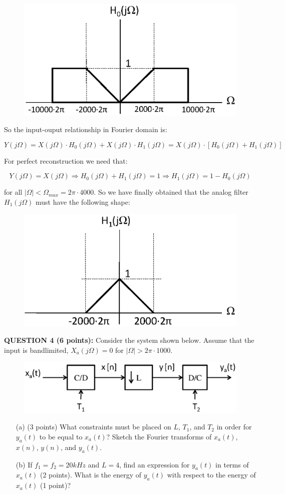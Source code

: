 \documentclass[a4paper,11pt,oneside]{article}
\begin{document}
\begin{figure}[h!]
\centering
\includegraphics[width=.5\textwidth]{fig3b.eps}
\label{fig3b}
\end{figure} 

So the input-ouput relationship in Fourier domain is: 

\[
Y(j\Omega)=X(j\Omega)\cdot H_{0}(j\Omega)+X(j\Omega)\cdot H_1(j\Omega)=X(j\Omega)\cdot\left[H_{0}(j\Omega)+H_{1}(j\Omega)\right]
\]

For perfect reconstruction we need that:

\[
Y(j\Omega)=X(j\Omega)\Rightarrow H_{0}(j\Omega)+H_{1}(j\Omega)=1 \Rightarrow H_1(j\Omega)=1-H_0(j\Omega)
\]

for all $|\Omega|<\Omega_{max}=2\pi\cdot 4000$. So we have finally obtained that the analog filter $H_{1}(j\Omega)$ must have the following shape:


\begin{figure}[h!]
\centering
\includegraphics[width=.5\textwidth]{fig3c.eps}
\label{fig3b}
\end{figure} 

\vspace{3cm}

\textbf{QUESTION 4 (6 points):} Consider the system shown below. Assume that the input is bandlimited, $X_a(j\Omega)=0$ for $|\Omega|>2\pi\cdot 1000$.

\begin{figure}[h!]
\centering
\includegraphics[width=.8\textwidth]{fig3.eps}
\label{fig3}
\end{figure} 
\begin{itemize}
\item[(a)] (3 points) What constraints must be placed on $L$, $T_1$, and $T_{2}$ in order for $y_a(t)$ to be equal to $x_a(t)$? Sketch the Fourier transforms of $x_a(t)$, $x(n)$, $y(n)$, and $y_a(t)$.
\item[(b)] If $f_1=f_2=20kHz$ and $L=4$, find an expression for $y_a(t)$ in terms of $x_a(t)$ (2 points). What is the energy of $y_{a}(t)$ with respect to the energy of $x_{a}(t)$ (1 point)?
\end{itemize}
\end{document}

